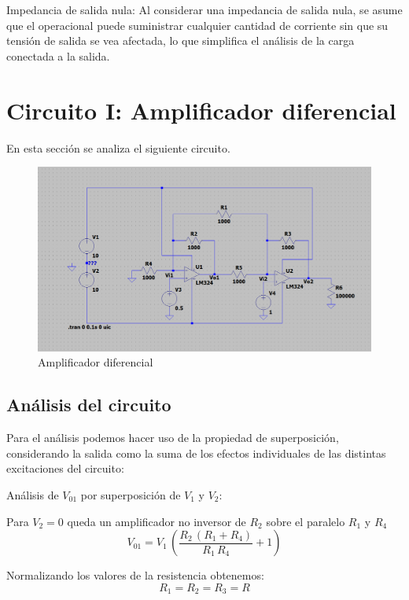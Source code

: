 \documentclass[12pt]{article}
\begin{document}
	Impedancia de salida nula: Al considerar una impedancia de salida nula, se asume que el operacional puede suministrar cualquier cantidad de corriente sin que su tensión de salida se vea afectada, lo que simplifica el análisis de la carga conectada a la salida.
	
	\section{Circuito I: Amplificador diferencial}
	
		En esta sección se analiza el siguiente circuito.
		\begin{figure}[h]
			\centering
			\includegraphics[width=1\linewidth]{Simulaciones-Resultados/Circuito1_esquematico}
			\caption{Amplificador diferencial}
			\label{fig:circuito1esquematico}
		\end{figure} 
		
		\subsection{Análisis del circuito}
		Para el análisis podemos hacer uso de la propiedad de superposición, considerando la salida como la suma de los
		efectos individuales de las distintas excitaciones del circuito:
		
		Análisis de $V_{01}$ por superposición de $V_1$ y $V_2$:
		
		Para $V_2=0$ queda un amplificador no inversor de $R_2$ sobre el paralelo $R_1$ y $R_4$
		\begin{equation}
			V_{01} = V_1 \,{\left(\frac{R_2 \,{\left(R_1 +R_4 \right)}}{R_1 \,R_4 }+1\right)}
		\end{equation}
		
		Normalizando los valores de la resistencia obtenemos:
		\begin{equation}
			R_1=R_2=R_3=R 
		\end{equation}
		
\end{document}
